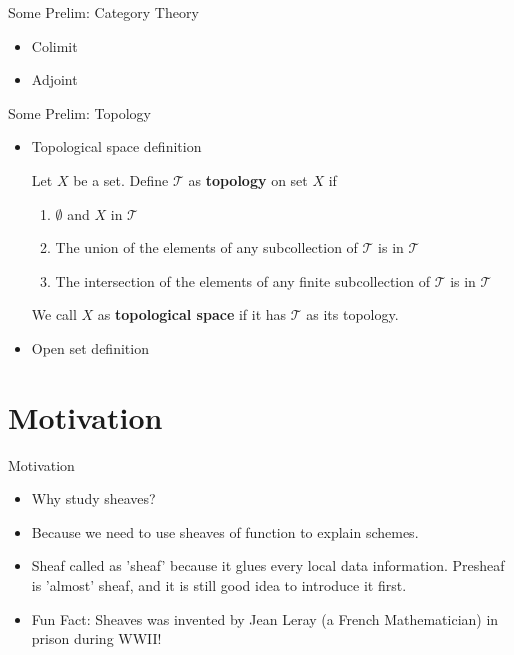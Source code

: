 \documentclass[10pt,aspectratio=1610]{beamer}
\theoremstyle{definition}
\begin{document}
    \begin{frame}{Some Prelim: Category Theory}
        \begin{itemize}
            \item Colimit
            \item Adjoint
        \end{itemize}
        
    \end{frame}

    \begin{frame}{Some Prelim: Topology}
        \begin{itemize}
            \item Topological space definition
            \begin{definition}[Topology]  
                Let $X$ be a set. Define $\mathcal{T}$ as \textbf{topology}  on set $X$ if 
                \begin{enumerate}
                    \item $\emptyset$ and $X$ in $\mathcal{T}$
                    \item The union of the elements of any subcollection of $\mathcal{T}$ is in $\mathcal{T}$
                    \item The intersection of the elements of any finite subcollection of $\mathcal{T}$ is in $\mathcal{T}$
                \end{enumerate}
                We call $X$ as \textbf{topological space} if it has $\mathcal{T}$ as its topology.
                 
            \end{definition}    
            \item Open set definition
        \end{itemize}
        
    \end{frame}

    \section{Motivation}

    \begin{frame}{Motivation}
        
        \begin{itemize}
            \item Why study sheaves? 
            \item Because we need to use sheaves of function to explain schemes.
            \item Sheaf called as 'sheaf' because it glues every local data information. Presheaf is 'almost' sheaf, and it is still good idea to introduce it first.
            \item Fun Fact: Sheaves was invented by Jean Leray (a French Mathematician) in prison during WWII!
        \end{itemize}
        
    \end{frame}
\end{document}

